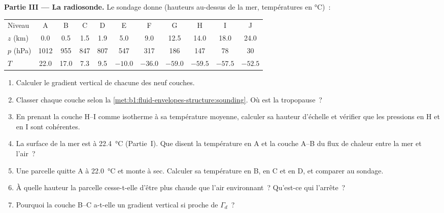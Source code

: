 \begin{problem}
\medskip
\noindent\textbf{Partie III --- La radiosonde.} Le sondage donne (hauteurs au-dessus
de la mer, températures en \si{\celsius})~:
\begin{center}
\small
\setlength{\tabcolsep}{4pt}
\begin{tabular}{|l|cccccccccc|}
\hline
Niveau & A & B & C & D & E & F & G & H & I & J \\
$z$ (km) & 0.0 & 0.5 & 1.5 & 1.9 & 5.0 & 9.0 & 12.5 & 14.0 & 18.0 & 24.0 \\
$p$ (hPa) & 1012 & 955 & 847 & 807 & 547 & 317 & 186 & 147 & 78 & 30 \\
$T$ & 22.0 & 17.0 & 7.3 & 9.5 & $-10.0$ & $-36.0$ & $-59.0$ & $-59.5$ & $-57.5$ & $-52.5$ \\
\hline
\end{tabular}
\end{center}
\begin{enumerate}[resume]
  \item Calculer le gradient vertical de chacune des neuf couches.
  \item Classer chaque couche selon la \cref{met:b1:fluid-envelopes-structure:sounding}.
        Où est la tropopause~?
  \item En prenant la couche H--I comme isotherme à sa température moyenne, calculer sa
        hauteur d'échelle et vérifier que les pressions en H et en I sont cohérentes.
  \item La surface de la mer est à \qty{22.4}{\celsius} (Partie~I). Que disent
        la température en A et la couche A--B du flux de chaleur entre la
        mer et l'air~?
  \item Une parcelle quitte A à \qty{22.0}{\celsius} et monte à sec. Calculer sa
        température en B, en C et en D, et comparer au sondage.
  \item À quelle hauteur la parcelle cesse-t-elle d'être plus chaude que l'air environnant~?
        Qu'est-ce qui l'arrête~?
  \item Pourquoi la couche B--C a-t-elle un gradient vertical si proche de $\Gamma_d$~?
\end{enumerate}


\end{problem}

